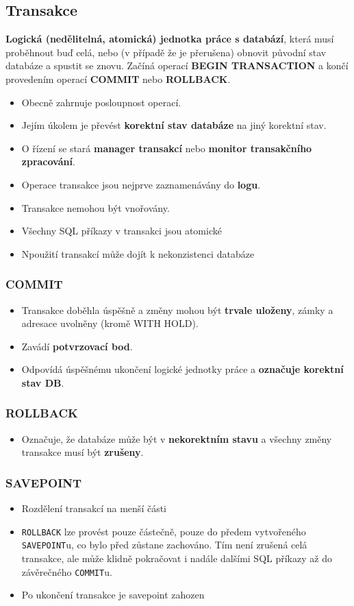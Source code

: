 \subsection{Transakce}
\textbf{Logická (nedělitelná, atomická) jednotka práce s databází}, která musí proběhnout buď celá, nebo (v případě že je přerušena) obnovit původní stav databáze a spustit se znovu. Začíná operací \textbf{BEGIN TRANSACTION} a končí provedením operací \textbf{COMMIT} nebo \textbf{ROLLBACK}.
\begin{itemize}
\item Obecně zahrnuje posloupnost operací.
\item Jejím úkolem je převést \textbf{korektní stav databáze} na jiný korektní stav.
\item O řízení se stará \textbf{manager transakcí} nebo \textbf{monitor transakčního zpracování}.
\item Operace transakce jsou nejprve zaznamenávány do\textbf{ logu}.
\item Transakce nemohou být vnořovány.
\item Všechny SQL příkazy v transakci jsou atomické
\item Npoužití transakcí může dojít k nekonzistenci databáze
\end{itemize}

\subsubsection{COMMIT}
\begin{itemize}
	\item Transakce doběhla úspěšně a změny mohou být \textbf{trvale uloženy}, zámky a adresace uvolněny (kromě WITH HOLD).
	\item Zavádí \textbf{potvrzovací bod}.
	\item Odpovídá úspěšnému ukončení logické jednotky práce a \textbf{označuje korektní stav DB}.
\end{itemize}
\subsubsection{ROLLBACK}
\begin{itemize}
	\item Označuje, že databáze může být v \textbf{nekorektním stavu} a všechny změny transakce musí být \textbf{zrušeny}.
\end{itemize}

\subsubsection{SAVEPOINT}
\begin{itemize}
	\item Rozdělení transakcí na menší části
	\item \texttt{ROLLBACK} lze provést pouze částečně, pouze do předem vytvořeného \texttt{SAVEPOINT}u, co bylo před zůstane zachováno. Tím není zrušená celá transakce, ale může klidně pokračovat i nadále dalšími SQL příkazy až do závěrečného \texttt{COMMIT}u.
	\item Po ukončení transakce je savepoint zahozen
\end{itemize}

